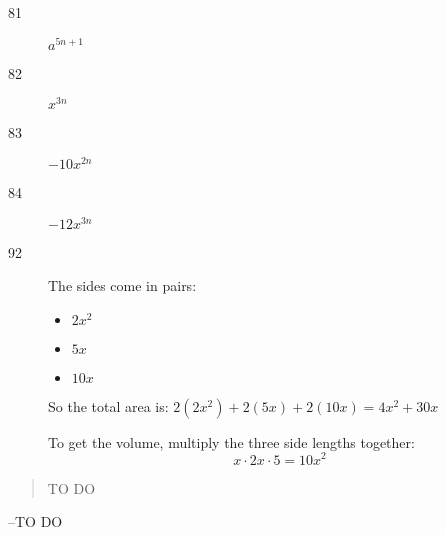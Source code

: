 \documentclass[letterpaper, landscape]{exam}
\begin{document}
\begin{description}
            \item[81] $a^{5n+1}$

            \item[82] $x^{3n}$

            \item[83] $-10x^{2n}$

            \item[84] $-12x^{3n}$ 

            \item[92]
                The sides come in pairs: 
                \begin{itemize}
                  \item $ 2x^2 $
                  \item $ 5x $
                  \item $ 10x $
                \end{itemize}

                So the total area is: $ 2(2x^2) + 2(5x) + 2(10x) = 4x^2 + 30x $

                To get the volume, multiply the three side lengths together: 
                \[
                    x \cdot 2x \cdot 5 = 10x^2 
                \]
        \end{description}

    \fi
    \ifprintanswers{}
    \else
        \vspace{8 cm}
        \begin{quote}
            \begin{em}
                TO DO
            \end{em}
        \end{quote}
        \hspace{1 cm} --TO DO
    \fi
\end{document}
